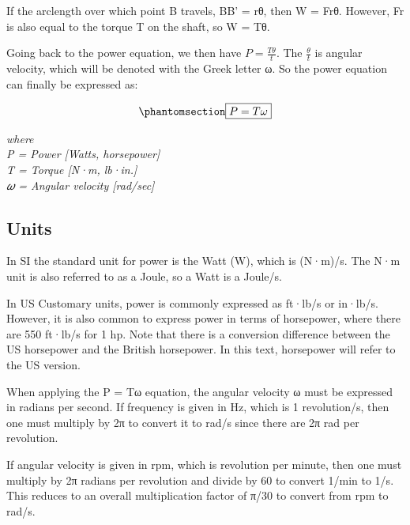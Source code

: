 \documentclass[
  letterpaper,
  DIV=11,
  numbers=noendperiod]{scrreprt}
\theoremstyle{definition}
\theoremstyle{remark}
\begin{document}
If the arclength over which point B travels, BB' = rθ, then W = Frθ.
However, Fr is also equal to the torque T on the shaft, so W = Tθ.

Going back to the power equation, we then have \(P=\frac{T \theta}{t}\).
The \(\frac{\theta}{t}\) is angular velocity, which will be denoted with
the Greek letter ω. So the power equation can finally be expressed as:

\begin{equation}\phantomsection\label{eq-6.4}{
\boxed{P = T\omega}
}\end{equation}

\emph{where}\\
\emph{P = Power {[}Watts, horsepower{]}}\\
\emph{T = Torque {[}N·m, lb·in.{]}}\\
\emph{𝜔 = Angular velocity {[}rad/sec{]}}

\subsection{Units}\label{units-1}

In SI the standard unit for power is the Watt (W), which is (N·m)/s. The
N·m unit is also referred to as a Joule, so a Watt is a Joule/s.

In US Customary units, power is commonly expressed as ft·lb/s or
in·lb/s. However, it is also common to express power in terms of
horsepower, where there are 550 ft·lb/s for 1 hp. Note that there is a
conversion difference between the US horsepower and the British
horsepower. In this text, horsepower will refer to the US version.

When applying the P = Tω equation, the angular velocity ω must be
expressed in radians per second. If frequency is given in Hz, which is 1
revolution/s, then one must multiply by 2π to convert it to rad/s since
there are 2π rad per revolution.

If angular velocity is given in rpm, which is revolution per minute,
then one must multiply by 2π radians per revolution and divide by 60 to
convert 1/min to 1/s. This reduces to an overall multiplication factor
of π/30 to convert from rpm to rad/s.
\end{document}
